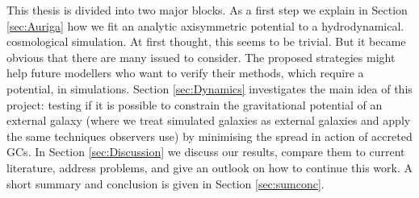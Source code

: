 This thesis is divided into two major blocks. As a first step we explain in Section \ref{sec:Auriga} how we fit an analytic axisymmetric potential to a hydrodynamical. cosmological simulation. At first thought, this seems to be trivial. But it became obvious that there are many issued to consider. The proposed strategies might help future modellers who want to verify their methods, which require a potential, in simulations. Section \ref{sec:Dynamics} investigates the main idea of this project: testing if it is possible to constrain the gravitational potential of an external galaxy (where we treat simulated galaxies as external galaxies and apply the same techniques observers use) by minimising the spread in action of accreted \acp{GC}. In Section \ref{sec:Discussion} we discuss our results, compare them to current literature, address problems, and give an outlook on how to continue this work. A short summary and conclusion is given in Section \ref{sec:sumconc}.